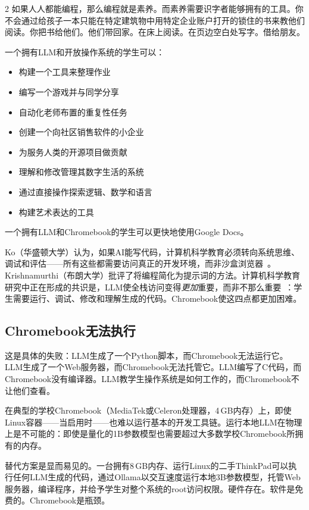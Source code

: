 \documentclass[11pt, a4paper]{article}
\begin{document}
\begin{multicols}{2}
如果人人都能编程，那么编程就是素养。而素养需要识字者能够拥有的工具。你不会通过给孩子一本只能在特定建筑物中用特定企业账户打开的锁住的书来教他们阅读。你把书给他们。他们带回家。在床上阅读。在页边空白处写字。借给朋友。

一个拥有LLM和开放操作系统的学生可以：

\begin{itemize}
  \item 构建一个工具来整理作业
  \item 编写一个游戏并与同学分享
  \item 自动化老师布置的重复性任务
  \item 创建一个向社区销售软件的小企业
  \item 为服务人类的开源项目做贡献
  \item 理解和修改管理其数字生活的系统
  \item 通过直接操作探索逻辑、数学和语言
  \item 构建艺术表达的工具
\end{itemize}

一个拥有LLM和Chromebook的学生可以更快地使用Google Docs。

Ko（华盛顿大学）认为，如果AI能写代码，计算机科学教育必须转向系统思维、调试和评估——所有这些都需要访问真正的开发环境，而非沙盒浏览器~\citep{denny2024computing}。Krishnamurthi（布朗大学）批评了将编程简化为提示词的方法。计算机科学教育研究中正在形成的共识是，LLM使全栈访问变得\emph{更加}重要，而非不那么重要~\citep{prather2024robots}：学生需要运行、调试、修改和理解生成的代码。Chromebook使这四点都更加困难。

\subsection{Chromebook无法执行}

这是具体的失败：LLM生成了一个Python脚本，而Chromebook无法运行它。LLM生成了一个Web服务器，而Chromebook无法托管它。LLM编写了C代码，而Chromebook没有编译器。LLM教学生操作系统是如何工作的，而Chromebook不让他们查看。

在典型的学校Chromebook（MediaTek或Celeron处理器，4\,GB内存）上，即使Linux容器——当启用时——也难以运行基本的开发工具链。运行本地LLM在物理上是不可能的：即使是量化的1B参数模型也需要超过大多数学校Chromebook所拥有的内存。

替代方案是显而易见的。一台拥有8\,GB内存、运行Linux的二手ThinkPad可以执行任何LLM生成的代码，通过Ollama以交互速度运行本地3B参数模型，托管Web服务器，编译程序，并给予学生对整个系统的root访问权限。硬件存在。软件是免费的。Chromebook是瓶颈。


\end{multicols}
\end{document}
